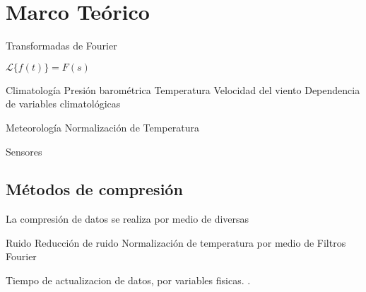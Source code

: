 \section{Marco Teórico}

Transformadas de Fourier

$\mathscr{L}\{f(t)\}=F(s)$

Climatología
   Presión barométrica
   Temperatura
   Velocidad del viento
   Dependencia de variables climatológicas

Meteorología
   Normalización de Temperatura


Sensores


\subsection{Métodos de compresión}

La compresión de datos se realiza por medio de diversas

   Ruido
      Reducción de ruido
      Normalización de temperatura por medio de Filtros
   Fourier

Tiempo de actualizacion de datos, por variables fisicas.
\cite{davis:6152C_6162C_SS}.


